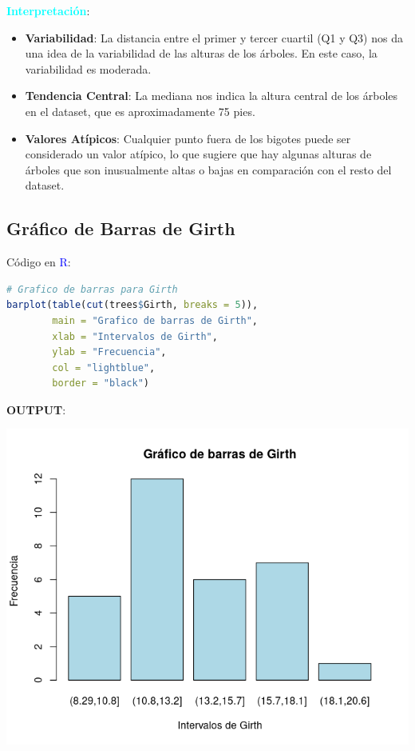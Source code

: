 \documentclass{article}
\begin{document}
\textbf{\textcolor{cyan}{Interpretación}}:
\begin{itemize}
    \item \textbf{Variabilidad}: La distancia entre el primer y tercer cuartil (Q1 y Q3) nos da una idea de la variabilidad de las alturas de los árboles. En este caso, la variabilidad es moderada.
    \item \textbf{Tendencia Central}: La mediana nos indica la altura central de los árboles en el dataset, que es aproximadamente 75 pies.
    \item \textbf{Valores Atípicos}: Cualquier punto fuera de los bigotes puede ser considerado un valor atípico, lo que sugiere que hay algunas alturas de árboles que son inusualmente altas o bajas en comparación con el resto del dataset.
\end{itemize}
\subsection{Gráfico de Barras de Girth}
Código en \textcolor{blue}{R}:
\begin{lstlisting}[language=R, caption=Gráfico d Barras d Girth]
# Grafico de barras para Girth
barplot(table(cut(trees$Girth, breaks = 5)),
        main = "Grafico de barras de Girth",
        xlab = "Intervalos de Girth",
        ylab = "Frecuencia",
        col = "lightblue",
        border = "black")
\end{lstlisting}
\textbf{OUTPUT}:
\begin{center} 
\includegraphics[width=1.0\textwidth]{code/Plots/Barra.png}
\end{center}
\end{document}
